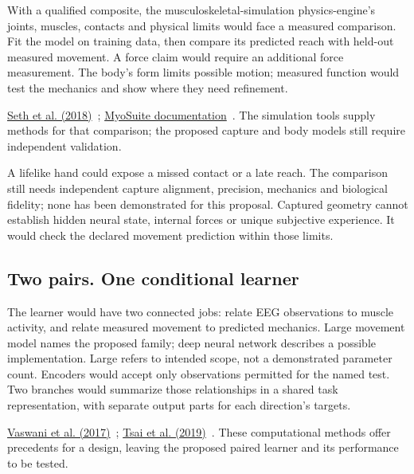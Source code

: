 With a qualified composite, the musculoskeletal-simulation physics-engine's
joints, muscles, contacts and physical limits would face a measured comparison.
Fit the model on training data, then compare its predicted reach with
held-out measured movement. A force claim would require an additional force
measurement. The body's form limits possible motion; measured function would
test the mechanics and show where they need refinement.
\par\noindent \href{https://journals.plos.org/ploscompbiol/article?id=10.1371/journal.pcbi.1006223}{Seth et al. (2018)}~\cite{opensim2018}; \href{https://myosuite.readthedocs.io/en/latest/}{MyoSuite documentation}~\cite{myosuiteDocsUndated}. The simulation tools supply methods for that comparison; the proposed capture and body models still require independent validation.

A lifelike hand could expose a missed contact or a late reach. The comparison
still needs independent capture alignment, precision, mechanics and biological
fidelity; none has been demonstrated for this proposal. Captured geometry
cannot establish hidden neural state, internal forces or unique subjective
experience. It would check the declared movement prediction within those limits.

\subsection{Two pairs. One conditional learner}
The learner would have two connected jobs: relate EEG observations to muscle
activity, and relate measured movement to predicted mechanics. Large movement
model names the proposed family; deep neural network describes a possible
implementation. Large refers to intended scope, not a demonstrated parameter
count. Encoders would accept only observations permitted for the named test.
Two branches would summarize those relationships in a shared task
representation, with separate output parts for each direction's targets.
\par\noindent \href{https://arxiv.org/html/1706.03762v7}{Vaswani et al. (2017)}~\cite{vaswani2017}; \href{https://aclanthology.org/P19-1656/}{Tsai et al. (2019)}~\cite{tsai2019}. These computational methods offer precedents for a design, leaving the proposed paired learner and its performance to be tested.

